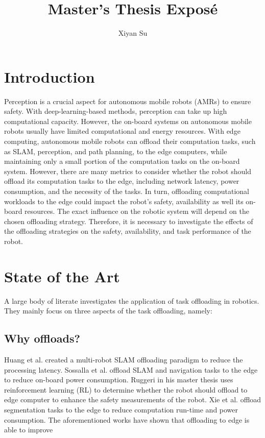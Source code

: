 \documentclass{article}
\title{Master's Thesis Expos\'e}
\author{Xiyan Su}
\date{}
\begin{document}
\maketitle

\section{Introduction}

Perception is a crucial aspect for autonomous mobile robots (AMRs) to ensure safety. With deep-learning-based methods, perception can take up high computational capacity. However, the on-board systems on autonomous mobile robots usually have limited computational and energy resources. With edge computing, autonomous mobile robots can offload their computation tasks, such as SLAM, perception, and path planning, to the edge computers, while maintaining only a small portion of the computation tasks on the on-board system. However, there are many metrics to consider whether the robot should offload its computation tasks to the edge, including network latency, power consumption, and the necessity of the tasks. In turn, offloading computational workloads to the edge could impact the robot's safety, availability as well its on-board resources. The exact influence on the robotic system will depend on the chosen offloading strategy. Therefore, it is necessary to investigate the effects of the offloading strategies on the safety, availability, and task performance of the robot. 

\section{State of the Art}

A large body of literate investigates the application of task offloading in robotics. They mainly focus on three aspects of the task offloading, namely: 

\subsection{Why offloads?}

Huang et al. \cite{Huang2022} created a multi-robot SLAM offloading paradigm to reduce the processing latency. Sossalla et al. \cite{Sossalla2022} offload SLAM and navigation tasks to the edge to reduce on-board power consumption. Ruggeri \cite{Ruggeri2022} in his master thesis uses reinforcement learning (RL) to determine whether the robot should offload to edge computer to enhance the safety measurements of the robot. Xie et al. \cite{Xie2021} offload segmentation tasks to the edge to reduce computation run-time and power consumption. The aforementioned works have shown that offloading to edge is able to improve 
\end{document}
